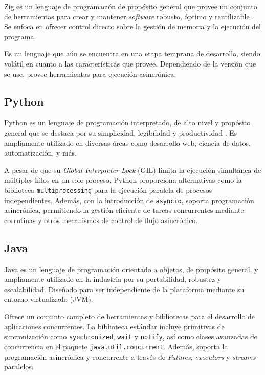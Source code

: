\documentclass[11pt]{article}
\let\Oldsubsection\subsection
\renewcommand{\subsection}{\FloatBarrier\Oldsubsection}
\newcommand{\english}[1]{\textit{#1}}
\begin{document}
Zig es un lenguaje de programación de propósito general que provee un conjunto de herramientas para crear y mantener \english{software} robusto, óptimo y reutilizable \cite{com:zig}. Se enfoca en ofrecer control directo sobre la gestión de memoria y la ejecución del programa.

Es un lenguaje que aún se encuentra en una etapa temprana de desarrollo, siendo volátil en cuanto a las características que provee. Dependiendo de la versión que se use, provee herramientas para ejecución asincrónica.

\subsection{Python}

Python es un lenguaje de programación interpretado, de alto nivel y propósito general que se destaca por su simplicidad, legibilidad y productividad \cite{com:python}. Es ampliamente utilizado en diversas áreas como desarrollo web, ciencia de datos, automatización, y más.

A pesar de que su \english{Global Interpreter Lock} (GIL) limita la ejecución simultánea de múltiples hilos en un solo proceso, Python proporciona alternativas como la biblioteca \lstinline{multiprocessing} para la ejecución paralela de procesos independientes. Además, con la introducción de \lstinline{asyncio}, soporta programación asincrónica, permitiendo la gestión eficiente de tareas concurrentes mediante corrutinas y otros mecanismos de control de flujo asincrónico.

\subsection{Java}

Java es un lenguaje de programación orientado a objetos, de propósito general, y ampliamente utilizado en la industria por su portabilidad, robustez y escalabilidad. Diseñado para ser independiente de la plataforma mediante su entorno virtualizado (JVM).

Ofrece un conjunto completo de herramientas y bibliotecas para el desarrollo de aplicaciones concurrentes. La biblioteca estándar incluye primitivas de sincronización como \lstinline{synchronized}, \lstinline{wait} y \lstinline{notify}, así como clases avanzadas de concurrencia en el paquete \lstinline{java.util.concurrent}. Además, soporta la programación asincrónica y concurrente a través de \english{Futures}, \english{executors} y \english{streams} paralelos.
\end{document}
